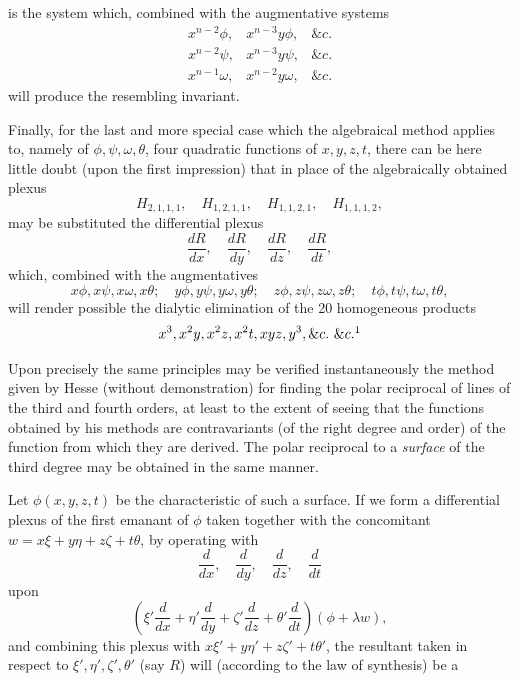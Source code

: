 \documentclass[11pt]{article}
\newcommand{\sourcepage}[1]{\marginpar{\scriptsize p.~#1}}
\begin{document}
{{\sourcepage{302}
is the system which, combined with the augmentative systems
\[
\begin{array}{ccc}
x^{n-2}\phi,&x^{n-3}y\phi,&\&c.\\
x^{n-2}\psi,&x^{n-3}y\psi,&\&c.\\
x^{n-1}\omega,&x^{n-2}y\omega,&\&c.
\end{array}
\]
will produce the resembling invariant.

Finally, for the last and more special case which the algebraical method applies to, namely of $\phi,\psi,\omega,\theta$, four quadratic functions of $x,y,z,t$, there can be here little doubt (upon the first impression) that in place of the algebraically obtained plexus
\[
H_{2,1,1,1},\quad H_{1,2,1,1},\quad H_{1,1,2,1},\quad H_{1,1,1,2},
\]
may be substituted the differential plexus
\[
\frac{dR}{dx},\quad \frac{dR}{dy},\quad \frac{dR}{dz},\quad \frac{dR}{dt},
\]
which, combined with the augmentatives
\[
x\phi,x\psi,x\omega,x\theta;
\quad y\phi,y\psi,y\omega,y\theta;
\quad z\phi,z\psi,z\omega,z\theta;
\quad t\phi,t\psi,t\omega,t\theta,
\]
will render possible the dialytic elimination of the 20 homogeneous products
\[
x^3,	x^2y,	x^2z,	x^2t,	xyz,	y^3,	\&c.\ \&c.\footnotemark
\]

Upon precisely the same principles may be verified instantaneously the method given by Hesse (without demonstration) for finding the polar reciprocal of lines of the third and fourth orders, at least to the extent of seeing that the functions obtained by his methods are contravariants (of the right degree and order) of the function from which they are derived. The polar reciprocal to a \emph{surface} of the third degree may be obtained in the same manner.

Let $\phi(x,y,z,t)$ be the characteristic of such a surface. If we form a differential plexus of the first emanant of $\phi$ taken together with the concomitant $w=x\xi+y\eta+z\zeta+t\theta$, by operating with
\[
\frac{d}{dx},\quad\frac{d}{dy},\quad\frac{d}{dz},\quad\frac{d}{dt}
\]
upon
\[
\left(\xi'\frac{d}{dx}+\eta'\frac{d}{dy}+\zeta'\frac{d}{dz}+\theta'\frac{d}{dt}\right)(\phi+\lambda w),
\]
and combining this plexus with $x\xi'+y\eta'+z\zeta'+t\theta'$, the resultant taken in respect to $\xi',\eta',\zeta',\theta'$ (say $R$) will (according to the law of synthesis) be a

}}
\end{document}
